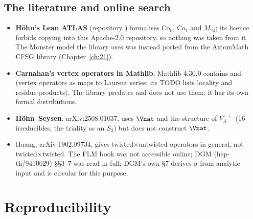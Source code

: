 \subsection{The literature and online search}
\begin{itemize}
\item \textbf{H\"ohn's Lean ATLAS} (repository ) formalises
  $\mathrm{Co}_0$, $\mathrm{Co}_1$ and $M_{24}$; its licence forbids copying
  into this Apache-2.0 repository, so nothing was taken from it. The Monster model the library uses was
  instead ported from the AxiomMath CFSG library (Chapter~\ref{ch:21}).
\item \textbf{Carnahan's vertex operators in Mathlib}: Mathlib 4.30.0 contains
   and  (vertex
  operators as maps to Laurent series; its TODO lists locality and residue products). The library
  predates and does not use them; it has its own formal distributions.
\item \textbf{H\"ohn--Seysen}, arXiv:2508.01037, uses $\Vnat$ and the structure of $V_\Lambda^{++}$
  (16 irreducibles, the triality as an $S_3$) but does not construct $\Vnat$.
\item Huang, arXiv:1902.09734, gives twisted$\times$untwisted operators in general, not
  twisted$\times$twisted. The FLM book was not accessible online; DGM (hep-th/9410029) \S\S3--7 was
  read in full; DGM's own \S7 derives $\sigma$ from analytic input and is circular for this purpose.
\end{itemize}

\section{Reproducibility}\label{ch15:sec:repro}

